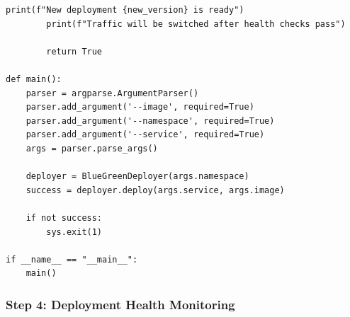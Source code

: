 \begin{lstlisting}[style=python, caption=scripts/blue_green_deploy.py]
        print(f"New deployment {new_version} is ready")
        print(f"Traffic will be switched after health checks pass")

        return True

def main():
    parser = argparse.ArgumentParser()
    parser.add_argument('--image', required=True)
    parser.add_argument('--namespace', required=True)
    parser.add_argument('--service', required=True)
    args = parser.parse_args()

    deployer = BlueGreenDeployer(args.namespace)
    success = deployer.deploy(args.service, args.image)

    if not success:
        sys.exit(1)

if __name__ == "__main__":
    main()
\end{lstlisting}

\subsubsection*{Step 4: Deployment Health Monitoring}

